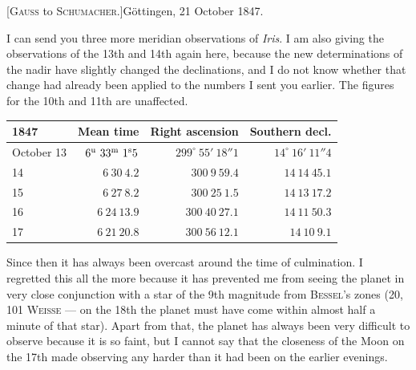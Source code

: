 \clearpage
\hypertarget{native-480-october21}{}
\begin{center}[\textsc{Gauss} to \textsc{Schumacher}.]\quad Göttingen, 21 October 1847.\end{center}

I can send you three more meridian observations of \emph{Iris}. I am also giving the observations of the 13th and 14th again here, because the new determinations of the nadir have slightly changed the declinations, and I do not know whether that change had already been applied to the numbers I sent you earlier. The figures for the 10th and 11th are unaffected.

\begin{center}
\setlength{\tabcolsep}{4pt}
\begin{tabular}{l|r|r|r}
1847 & Mean time & Right ascension & Southern decl. \\\hline
October 13 & $6^{\rm u}\ 33^{\rm m}\ 1^{\rm s}5$ & $299^\circ\ 55'\ 18''1$ & $14^\circ\ 16'\ 11''4$ \\
\hfill 14 & $6\ 30\ 4.2$ & $300\ 9\ 59.4$ & $14\ 14\ 45.1$ \\
\hfill 15 & $6\ 27\ 8.2$ & $300\ 25\ 1.5$ & $14\ 13\ 17.2$ \\
\hfill 16 & $6\ 24\ 13.9$ & $300\ 40\ 27.1$ & $14\ 11\ 50.3$ \\
\hfill 17 & $6\ 21\ 20.8$ & $300\ 56\ 12.1$ & $14\ 10\ 9.1$ \\
\end{tabular}
\end{center}

Since then it has always been overcast around the time of culmination. I regretted this all the more because it has prevented me from seeing the planet in very close conjunction with a star of the 9th magnitude from \textsc{Bessel}’s zones (20, 101 \textsc{Weisse} — on the 18th the planet must have come within almost half a minute of that star). Apart from that, the planet has always been very difficult to observe because it is so faint, but I cannot say that the closeness of the Moon on the 17th made observing any harder than it had been on the earlier evenings.